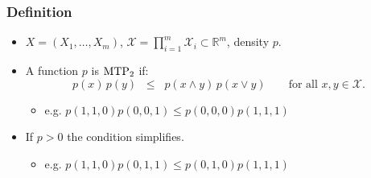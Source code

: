 \documentclass[dvipsnames,aspectratio=169]{beamer} %
\newcommand{\R}{\mathbb{R}}
\newcommand{\cX}{\mathcal{X}}
\newcommand{\mtp}{{\rm MTP}_{2}}
\begin{document}
\begin{frame}
\frametitle{Definition}
	\begin{itemize}
\item $X=(X_{1},\ldots,X_{m})$, $\cX=\prod_{i=1}^m\cX_i\subset \R^m$, density $p$.\\[.7cm]
\item A function $p$  is \alert{$\mtp$} if:
$$
p(x)\,p(y)\;\;\leq\;\; p(x\wedge y)\,p(x\vee y)\qquad\mbox{for all }x,y\in \cX.
$$
\vspace{-.5cm}
\begin{itemize}
\item e.g. $p(1,1,0)p(0,0,1)\leq p(0,0,0)p(1,1,1)$\\[.7cm]
 \end{itemize}
 \item If $p>0$ the condition simplifies.\\[.2cm]
\begin{itemize}
\item e.g. $p(1,1,0)p(0,1,1)\leq p(0,1,0)p(1,1,1)$\\[.7cm]
 \end{itemize}
 \end{itemize}
\end{frame}

%
\end{document}
